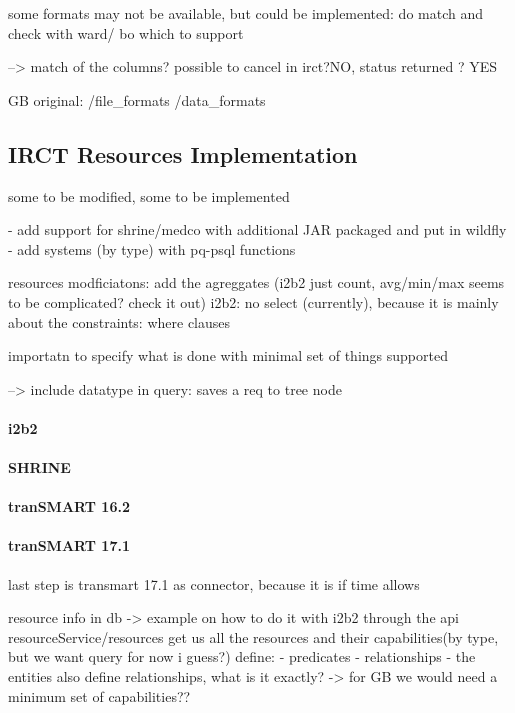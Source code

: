 some formats may not be available, but could be implemented: do match and check with ward/ bo which to support

--> match of the columns? possible to cancel in irct?NO, status returned ? YES

GB original: 
/file\_formats
/data\_formats


\subsection{IRCT Resources Implementation}
some to be modified, some to be implemented

- add support for shrine/medco with additional JAR packaged and put in wildfly
- add systems (by type) with pq-psql functions

resources modficiatons: add the agreggates (i2b2 just count, avg/min/max seems to be complicated? check it out)
i2b2: no select (currently), because it is mainly about the constraints: where clauses

importatn to specify what is done with minimal set of things supported

--> include datatype in query: saves a req to tree node
\paragraph{i2b2}

\paragraph{SHRINE}

\paragraph{tranSMART 16.2}

\paragraph{tranSMART 17.1}
last step is transmart 17.1 as connector, because it is if time allows


resource info in db -> example on how to do it with i2b2
through the api resourceService/resources get us all the resources and their capabilities(by type, but we want query for now i guess?)
define:
- predicates
- relationships
- the entities also define relationships, what is it exactly?
-> for GB we would need a minimum set of capabilities??

